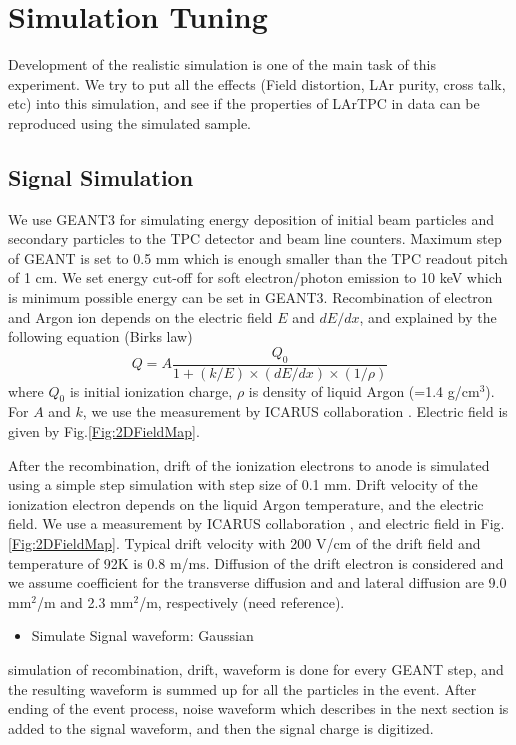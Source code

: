 \section{Simulation Tuning}

Development of the realistic simulation is one of the main task of this experiment.
We try to put all the effects (Field distortion, LAr purity, cross talk, etc) into this simulation,
and see if the properties of LArTPC in data can be reproduced using the simulated sample.

\label{Sec:Simulation}
\subsection{Signal Simulation}
We use GEANT3 for simulating energy deposition of initial beam particles and
secondary particles to the TPC detector and beam line counters. 
Maximum step of GEANT is set to 0.5 mm which is enough smaller than the TPC readout pitch of 1 cm.
We set energy cut-off for soft electron/photon emission to 10 keV which is minimum possible energy can be set in GEANT3.
Recombination of electron and Argon ion depends on the electric field $E$ and $dE/dx$, and explained by the following equation (Birks law)
\begin{equation}
  Q = A\frac{Q_{0}}{1+(k/E)\times(dE/dx)\times(1/\rho)}
\label{eq:birkslaw}
\end{equation}
where $Q_{0}$ is initial ionization charge, $\rho$ is density of liquid Argon (=1.4 g/cm$^3$).
For $A$ and $k$, we use the measurement by ICARUS collaboration \cite{658352}.
Electric field is given by Fig.\ref{Fig:2DFieldMap}.

After the recombination, drift of the ionization electrons to anode is simulated
using a simple step simulation with step size of 0.1 mm.
Drift velocity of the ionization electron depends on the liquid Argon temperature,
and the electric field. We use a measurement by ICARUS collaboration \cite{649233}, and
electric field in Fig.\ref{Fig:2DFieldMap}. 
Typical drift velocity with 200 V/cm of the drift field and temperature of 92K is 0.8 m/ms.
Diffusion of the drift electron is considered and we assume coefficient for the transverse diffusion 
and and lateral diffusion are 9.0 mm$^2$/m and 2.3 mm$^2$/m, respectively (need reference).

\begin{itemize}
\item Simulate Signal waveform: Gaussian
\end{itemize}
simulation of recombination, drift, waveform is done for every GEANT step, and
the resulting waveform is summed up for all the particles in the event.
After ending of the event process, noise waveform which describes in the next section is added to the signal waveform,
and then the signal charge is digitized.


